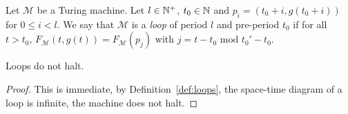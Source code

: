 







\begin{definition}[Loops]\label{def:loops}
    Let $\mathcal{M}$ be a Turing machine. Let $l\in\mathbb{N}^+$, $t_0 \in \mathbb{N}$ and $p_i = (t_0+i, g(t_0+i))$ for $0 \leq i < l$. We say that $\mathcal{M}$ is a \textit{loop} of period $l$ and pre-period $t_0$ if for all $t > t_0$, $F_\mathcal{M}(t,g(t)) = F_\mathcal{M}(p_j)$ with $j = t-t_0 \text{ mod } t_0' - t_0$.
\end{definition}

\begin{lemma}\label{lem:loopdonthalt}
    Loops do not halt.
\end{lemma}
\begin{proof} This is immediate, by Definition~\ref{def:loops}, the space-time diagram of a loop is infinite, the machine does not halt.
\end{proof}

